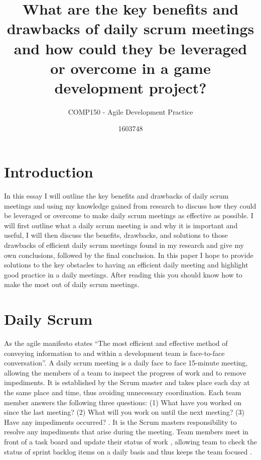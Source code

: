 \documentclass{scrartcl}
\title{What are the key benefits and drawbacks of daily scrum meetings and how could they be leveraged or overcome in a game development project?}
\subtitle{COMP150 - Agile Development Practice}
\author{1603748}
\begin{document}
\maketitle


\section{Introduction}
 
In this essay I will outline the key benefits and drawbacks of daily scrum meetings and using my knowledge gained from research to discuss how they could be leveraged or overcome to make daily scrum meetings as effective as possible. I will first outline what a daily scrum meeting is and why it is important and useful, I will then discuss the benefits, drawbacks, and solutions to those drawbacks of efficient daily scrum meetings found in my research and give my own conclusions, followed by the final conclusion. In this paper I hope to provide solutions to the key obstacles to having an efficient daily meeting and highlight good practice in a daily meetings. After reading this you should know how to make the most out of daily scrum meetings.

\section{Daily Scrum}

As the agile manifesto \cite{Manifesto} states ``The most efficient and effective method of 
conveying information to and within a development 
team is face-to-face conversation''. A daily scrum meeting is a daily face to face 15-minute meeting, allowing the members of a team to inspect the progress of work and to remove impediments. It is established by the Scrum master and takes place each day at the same place and time, thus avoiding unnecessary coordination. Each team member answers the following three questions: (1) What have you worked on since the last meeting? (2) What will you work on until the next meeting? (3) Have any impediments occurred? \cite{ScrumEveryDay}. It is the Scrum masters responsibility to resolve any impediments that arise during the meeting. Team members meet in front of a task board and update their status of work \cite{Multitouch}, allowing team to check the status of sprint backlog items on a daily basis and thus keeps the team focused \cite{ScrumEveryDay}.
\end{document}
